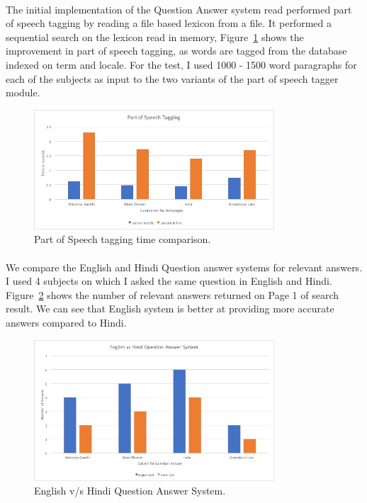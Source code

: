 \paragraph{}
The initial implementation of the Question Answer system read performed part of speech tagging by reading a file based lexicon from a file. It performed a sequential search on the lexicon read in memory, Figure~\ref{fig:QA_performance2} shows the improvement in part of speech tagging, as words are tagged from the database indexed on term and locale. For the test, I used 1000 - 1500 word paragraphs for each of the subjects as input to the two variants of the part of speech tagger module.

\begin{figure}[htb]
\centering
\includegraphics[width=0.8\textwidth]{images/QA_performance2.jpg}
\caption{Part of Speech tagging time comparison.} 
\label{fig:QA_performance2}
\end{figure}
\break

\paragraph{}
We compare the English and Hindi Question answer systems for relevant answers. I used 4 subjects on which I asked the same question in English and Hindi. Figure~\ref{fig:QA_performance3} shows the number of relevant answers returned on Page 1 of search result. We can see that English system is better at providing more accurate answers compared to Hindi. 

\begin{figure}[htb]
\centering
\includegraphics[width=0.8\textwidth]{images/QA_performance3.jpg}
\caption{English v/s Hindi Question Answer System.} 
\label{fig:QA_performance3}
\end{figure}


